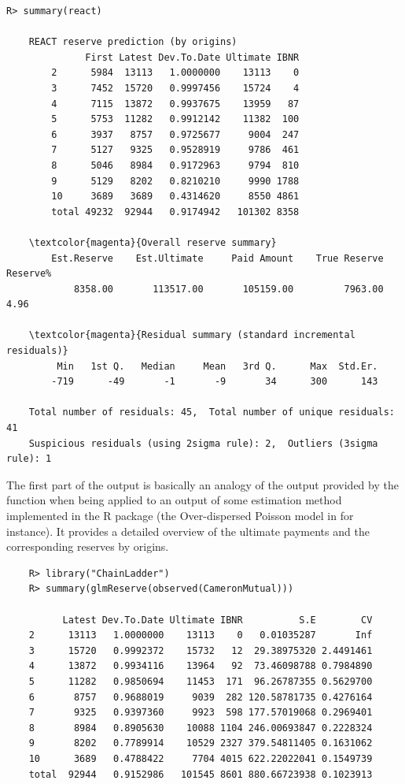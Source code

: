 \begin{Verbatim}[commandchars=\\\{\}]
    R> summary(react)

    REACT reserve prediction (by origins)
              First Latest Dev.To.Date Ultimate IBNR
        2      5984  13113   1.0000000    13113    0
        3      7452  15720   0.9997456    15724    4
        4      7115  13872   0.9937675    13959   87
        5      5753  11282   0.9912142    11382  100
        6      3937   8757   0.9725677     9004  247
        7      5127   9325   0.9528919     9786  461
        8      5046   8984   0.9172963     9794  810
        9      5129   8202   0.8210210     9990 1788
        10     3689   3689   0.4314620     8550 4861
        total 49232  92944   0.9174942   101302 8358

    \textcolor{magenta}{Overall reserve summary}
        Est.Reserve    Est.Ultimate     Paid Amount    True Reserve        Reserve% 
            8358.00       113517.00       105159.00         7963.00            4.96 

    \textcolor{magenta}{Residual summary (standard incremental residuals)}
         Min   1st Q.   Median     Mean   3rd Q.      Max  Std.Er. 
        -719      -49       -1       -9       34      300      143 

    Total number of residuals: 45,  Total number of unique residuals: 41
    Suspicious residuals (using 2sigma rule): 2,  Outliers (3sigma rule): 1
\end{Verbatim}
The first part of the output is basically an analogy of the  output provided by the  function
when being applied to an output of some estimation method implemented in the R package  (the Over-dispersed Poisson model in  for instance). It provides a detailed overview of the ultimate payments and the corresponding reserves by origins. 
\begin{verbatim}
    R> library("ChainLadder")
    R> summary(glmReserve(observed(CameronMutual)))

          Latest Dev.To.Date Ultimate IBNR          S.E        CV
    2      13113   1.0000000    13113    0   0.01035287       Inf
    3      15720   0.9992372    15732   12  29.38975320 2.4491461
    4      13872   0.9934116    13964   92  73.46098788 0.7984890
    5      11282   0.9850694    11453  171  96.26787355 0.5629700
    6       8757   0.9688019     9039  282 120.58781735 0.4276164
    7       9325   0.9397360     9923  598 177.57019068 0.2969401
    8       8984   0.8905630    10088 1104 246.00693847 0.2228324
    9       8202   0.7789914    10529 2327 379.54811405 0.1631062
    10      3689   0.4788422     7704 4015 622.22022041 0.1549739
    total  92944   0.9152986   101545 8601 880.66723938 0.1023913
\end{verbatim}
